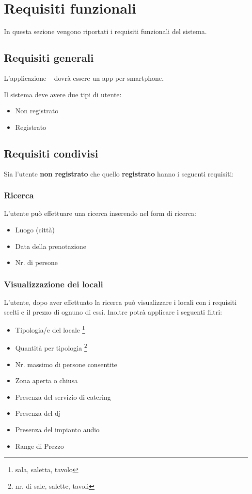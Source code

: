 \chapter{Requisiti funzionali}
In questa sezione vengono riportati i requisiti funzionali del sistema.

\section*{Requisiti generali}
L'applicazione \NameOfTheProject~ dovrà essere un app per smartphone.

\noindent Il sistema deve avere due tipi di utente:
\begin{itemize}
    \item Non registrato
    \item Registrato
\end{itemize}

\section{Requisiti condivisi}
Sia l'utente \textbf{non registrato} che quello \textbf{registrato} hanno i seguenti requisiti:

\subsection{Ricerca}\label{sec:ricerca}

L'utente può effettuare una ricerca inserendo nel form di ricerca:
\begin{itemize}
    \item Luogo (città)
    \item Data della prenotazione
    \item Nr. di persone
    \label{itm:ricerca}
\end{itemize}

\subsection{Visualizzazione dei locali} \label{sec:visLocali}
L'utente, dopo aver effettuato la ricerca può visualizzare i locali con i requisiti scelti e il prezzo di ognuno di
essi. Inoltre potrà applicare i seguenti filtri:
\begin{itemize}
    \item Tipologia/e del locale \footnote{sala, saletta, tavolo}
    \item Quantità per tipologia \footnote{nr. di sale, salette, tavoli}
    \item Nr. massimo di persone consentite
    \item Zona aperta o chiusa
    \item Presenza del servizio di catering
    \item Presenza del dj
    \item Presenza del impianto audio
    \item Range di Prezzo
    \label{itm:filtri}
\end{itemize}

